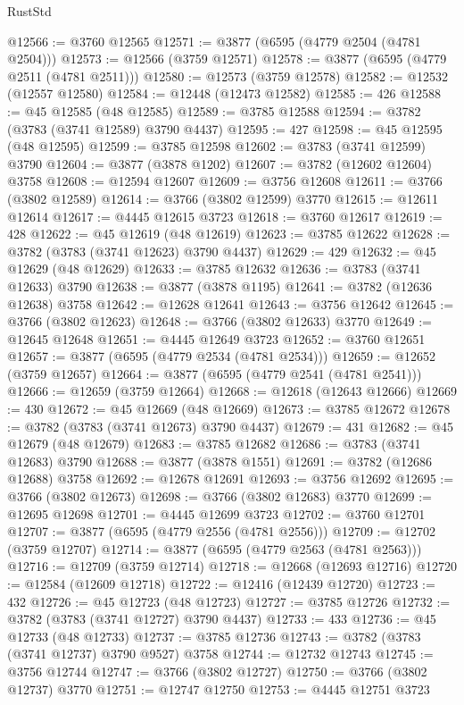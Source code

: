 \begin{lexlean}{RustStd}
\begin{coremodule}
@12566 := @3760 @12565
@12571 := @3877 (@6595 (@4779 @2504 (@4781 @2504)))
@12573 := @12566 (@3759 @12571)
@12578 := @3877 (@6595 (@4779 @2511 (@4781 @2511)))
@12580 := @12573 (@3759 @12578)
@12582 := @12532 (@12557 @12580)
@12584 := @12448 (@12473 @12582)
@12585 := 426
@12588 := @45 @12585 (@48 @12585)
@12589 := @3785 @12588
@12594 := @3782 (@3783 (@3741 @12589) @3790 @4437)
@12595 := 427
@12598 := @45 @12595 (@48 @12595)
@12599 := @3785 @12598
@12602 := @3783 (@3741 @12599) @3790
@12604 := @3877 (@3878 @1202)
@12607 := @3782 (@12602 @12604) @3758
@12608 := @12594 @12607
@12609 := @3756 @12608
@12611 := @3766 (@3802 @12589)
@12614 := @3766 (@3802 @12599) @3770
@12615 := @12611 @12614
@12617 := @4445 @12615 @3723
@12618 := @3760 @12617
@12619 := 428
@12622 := @45 @12619 (@48 @12619)
@12623 := @3785 @12622
@12628 := @3782 (@3783 (@3741 @12623) @3790 @4437)
@12629 := 429
@12632 := @45 @12629 (@48 @12629)
@12633 := @3785 @12632
@12636 := @3783 (@3741 @12633) @3790
@12638 := @3877 (@3878 @1195)
@12641 := @3782 (@12636 @12638) @3758
@12642 := @12628 @12641
@12643 := @3756 @12642
@12645 := @3766 (@3802 @12623)
@12648 := @3766 (@3802 @12633) @3770
@12649 := @12645 @12648
@12651 := @4445 @12649 @3723
@12652 := @3760 @12651
@12657 := @3877 (@6595 (@4779 @2534 (@4781 @2534)))
@12659 := @12652 (@3759 @12657)
@12664 := @3877 (@6595 (@4779 @2541 (@4781 @2541)))
@12666 := @12659 (@3759 @12664)
@12668 := @12618 (@12643 @12666)
@12669 := 430
@12672 := @45 @12669 (@48 @12669)
@12673 := @3785 @12672
@12678 := @3782 (@3783 (@3741 @12673) @3790 @4437)
@12679 := 431
@12682 := @45 @12679 (@48 @12679)
@12683 := @3785 @12682
@12686 := @3783 (@3741 @12683) @3790
@12688 := @3877 (@3878 @1551)
@12691 := @3782 (@12686 @12688) @3758
@12692 := @12678 @12691
@12693 := @3756 @12692
@12695 := @3766 (@3802 @12673)
@12698 := @3766 (@3802 @12683) @3770
@12699 := @12695 @12698
@12701 := @4445 @12699 @3723
@12702 := @3760 @12701
@12707 := @3877 (@6595 (@4779 @2556 (@4781 @2556)))
@12709 := @12702 (@3759 @12707)
@12714 := @3877 (@6595 (@4779 @2563 (@4781 @2563)))
@12716 := @12709 (@3759 @12714)
@12718 := @12668 (@12693 @12716)
@12720 := @12584 (@12609 @12718)
@12722 := @12416 (@12439 @12720)
@12723 := 432
@12726 := @45 @12723 (@48 @12723)
@12727 := @3785 @12726
@12732 := @3782 (@3783 (@3741 @12727) @3790 @4437)
@12733 := 433
@12736 := @45 @12733 (@48 @12733)
@12737 := @3785 @12736
@12743 := @3782 (@3783 (@3741 @12737) @3790 @9527) @3758
@12744 := @12732 @12743
@12745 := @3756 @12744
@12747 := @3766 (@3802 @12727)
@12750 := @3766 (@3802 @12737) @3770
@12751 := @12747 @12750
@12753 := @4445 @12751 @3723

\end{coremodule}
\end{lexlean}
